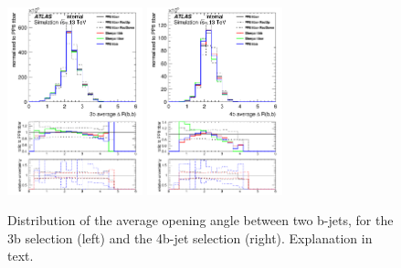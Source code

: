 \begin{figure}[!htb]
\centering
\includegraphics[width=0.35\textwidth]{Plots/ttbb/hisgenEvt_Dr_GenBJetsAverage_4j3t__div}
\includegraphics[width=0.35\textwidth]{Plots/ttbb/hisgenEvt_Dr_GenBJetsAverage_4j4t__div}
  \caption{Distribution of the average opening angle between two b-jets, for the 3b selection (left) and the 4b-jet selection (right). Explanation in text. \label{ttbb:avedR}}
\end{figure}

